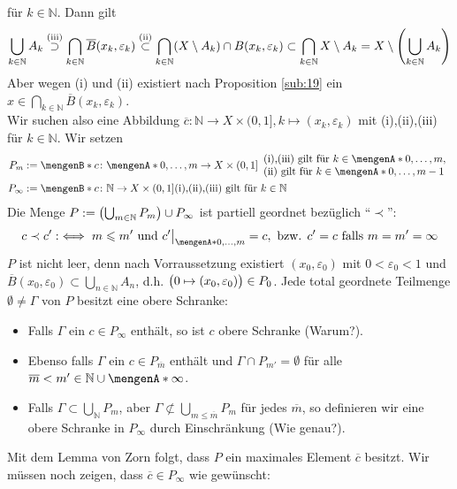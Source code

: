 für $k \in \mathds{N}$. Dann gilt 
\[
	\bigcup_{k \in \mathds{N}} A_k \stackrel{\text{(iii)}}{\supset} \bigcap_{k \in \mathds{N}} \overline{B}(x_k, \varepsilon_k) \stackrel{\text{(ii)}}{\subset} 
	\bigcap_{k \in \mathds{N}}(X \setminus A_k) \cap B(x_k, \varepsilon_k) \subset \bigcap_{k \in \mathds{N}} X \setminus A_k = X \setminus 
	\enbrace*{\bigcup_{k \in \mathds{N}} A_k} 
\]
Aber wegen (i) und (ii) existiert nach Proposition \ref{sub:19} ein $x \in \bigcap_{k \in \mathds{N}}\overline{B}(x_k,\varepsilon_k)$. \light \medskip \\
Wir suchen also eine Abbildung $\overline{c} \colon \mathds{N} \to X \times (0,1], k  \mapsto(x_k, \varepsilon_k)$ mit (i),(ii),(iii) für $k \in \mathds{N}$. Wir setzen
\begin{align*}
	P_m &:= \set[{c \colon \set{0, \ldots ,m} \to X \times (0,1] }]{\begin{array}{l}
		\text{(i),(iii) gilt für }k \in \set{0, \ldots , m}, \\
		\text{(ii) gilt für }k \in \set{0, \ldots , m-1}
	\end{array} }  \\
	P_\infty &:= \set[{c \colon \mathds{N} \to X \times (0,1]}]{\text{(i),(ii),(iii) gilt für } k \in \mathds{N} \rule{0cm}{0.3cm}} 
\end{align*}
Die Menge $P := \enbrace*{\bigcup_{m \in \mathds{N}} P_m} \cup P_\infty$ ist partiell geordnet bezüglich \enquote{$\prec$}:
\[
	c \prec c' :\iff m \le m' \text{ und } c'\big|_{\set{0,\ldots ,m}} =c , \text{ bzw. } c'=c \text{ falls } m=m'=\infty
\]
$P$ ist nicht leer, denn nach Vorraussetzung existiert $(x_0,\varepsilon_0)$ mit $0 < \varepsilon_0 < 1$ und $\overline{B}(x_0, \varepsilon_0) \subset 
\bigcup_{n \in\mathds{N}} A_n$, d.h. $\enbrace[\big]{0 \mapsto (x_0,\varepsilon_0)} \in P_0$. Jede total geordnete Teilmenge $\emptyset \not= \Gamma$ von $P$ besitzt eine 
obere Schranke:
\begin{itemize}
	\item Falls $\Gamma$ ein $c\in P_\infty$ enthält, so ist $c$ obere Schranke (Warum?).
	\item Ebenso falls $\Gamma$ ein $c \in P_{\overline{m}}$ enthält und $\Gamma \cap P_{m'}= \emptyset$ für alle $\overline{m} < m' \in \mathds{N} \cup \set{\infty}$.
	\item Falls $\Gamma \subset \bigcup_{\mathds{N}} P_m$, aber $\Gamma \not\subset \bigcup_{m \le \overline{m}} P_m$ für jedes $\overline{m}$, so definieren wir eine
	obere Schranke in $P_\infty$ durch Einschränkung (Wie genau?).
\end{itemize}
Mit dem Lemma von Zorn folgt, dass $P$ ein maximales Element $\overline{c}$ besitzt. Wir müssen noch zeigen, dass $\overline{c}\in P_\infty$ wie gewünscht:

